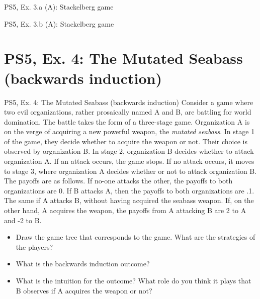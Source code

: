 \begin{frame}{PS5, Ex. 3.a (A): Stackelberg game}
  \begin{multicols}{2}
    \vfill\null \columnbreak
    \vfill\null
  \end{multicols}
\end{frame}

\begin{frame}{PS5, Ex. 3.b (A): Stackelberg game}
  \begin{multicols}{2}
    \vfill\null \columnbreak
    \vfill\null
  \end{multicols}
\end{frame}



\section{PS5, Ex. 4: The Mutated Seabass (backwards induction)}

\begin{frame}{PS5, Ex. 4: The Mutated Seabass (backwards induction)}
    Consider a game where two evil organizations, rather prosaically named A and B, are battling for world domination. The battle takes the form of a three-stage game. Organization A is on the verge of acquiring a new powerful weapon, the \textit{mutated seabass}. In stage 1 of the game, they decide whether to acquire the weapon or not. Their choice is observed by organization B. In stage 2, organization B decides whether to attack organization A. If an attack occurs, the game stops. If no attack occurs, it moves to stage 3, where organization A decides whether or not to attack organization B. The payoffs are as follows. If no-one attacks the other, the payoffs to both organizations are 0. If B attacks A, then the payoffs to both organizations are .1. The same if A attacks B, without having acquired the seabass weapon. If, on the other hand, A acquires the weapon, the payoffs from A attacking B are 2 to A and -2 to B.
    \begin{itemize}
      \item[(a)] Draw the game tree that corresponds to the game. What are the strategies of the players?
      \item[(b)] What is the backwards induction outcome?
      \item[(c)] What is the intuition for the outcome? What role do you think it plays that B observes if A acquires the weapon or not?
    \end{itemize}
  \vfill\null
\end{frame}

